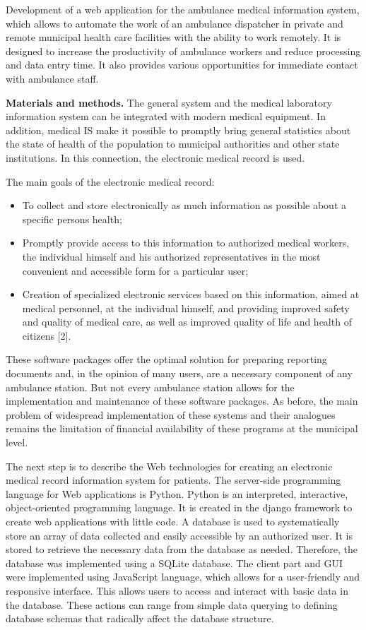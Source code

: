 \begin{multicols}{2}
Development of a web application for the ambulance medical information
system, which allows to automate the work of an ambulance dispatcher in
private and remote municipal health care facilities with the ability to
work remotely. It is designed to increase the productivity of ambulance
workers and reduce processing and data entry time. It also provides
various opportunities for immediate contact with ambulance staff.

{\bfseries Materials and methods.} The general system and the medical
laboratory information system can be integrated with modern medical
equipment. In addition, medical IS make it possible to promptly bring
general statistics about the state of health of the population to
municipal authorities and other state institutions. In this connection,
the electronic medical record is used.

The main goals of the electronic medical record:

\begin{itemize}
\item
  To collect and store electronically as much information as possible
  about a specific person\textquotesingle s health;
\item
  Promptly provide access to this information to authorized medical
  workers, the individual himself and his authorized representatives in
  the most convenient and accessible form for a particular user;
\item
  Creation of specialized electronic services based on this information,
  aimed at medical personnel, at the individual himself, and providing
  improved safety and quality of medical care, as well as improved
  quality of life and health of citizens {[}2{]}.
\end{itemize}

These software packages offer the optimal solution for preparing
reporting documents and, in the opinion of many users, are a necessary
component of any ambulance station. But not every ambulance station
allows for the implementation and maintenance of these software
packages. As before, the main problem of widespread implementation of
these systems and their analogues remains the limitation of financial
availability of these programs at the municipal level.

The next step is to describe the Web technologies for creating an
electronic medical record information system for patients. The
server-side programming language for Web applications is Python. Python
is an interpreted, interactive, object-oriented programming language. It
is created in the django framework to create web applications with
little code. A database is used to systematically store an array of data
collected and easily accessible by an authorized user. It is stored to
retrieve the necessary data from the database as needed. Therefore, the
database was implemented using a SQLite database. The client part and
GUI were implemented using JavaScript language, which allows for a
user-friendly and responsive interface. This allows users to access and
interact with basic data in the database. These actions can range from
simple data querying to defining database schemas that radically affect
the database structure.


\end{multicols}
